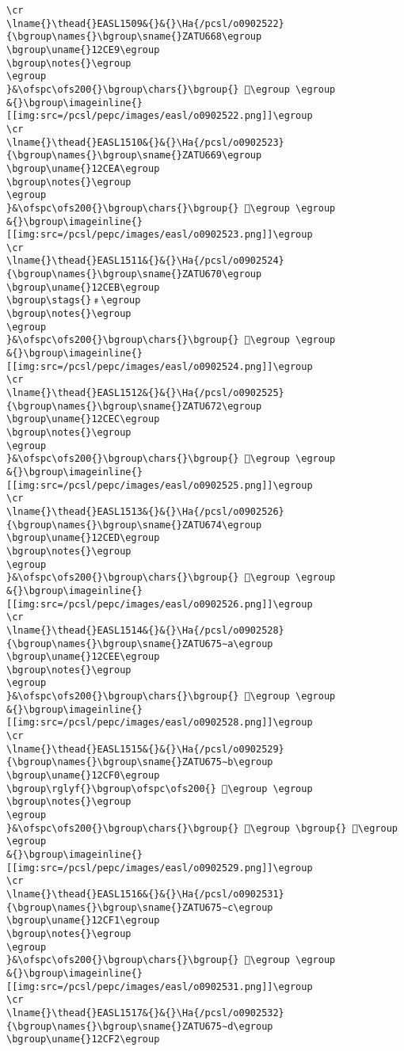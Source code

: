 \begin{verbatim}
\cr
\lname{}\thead{}EASL1509&{}&{}\Ha{/pcsl/o0902522}{\bgroup\names{}\bgroup\sname{}ZATU668\egroup
\bgroup\uname{}12CE9\egroup
\bgroup\notes{}\egroup
\egroup
}&\ofspc\ofs200{}\bgroup\chars{}\bgroup{} 𒳩\egroup \egroup
&{}\bgroup\imageinline{}[[img:src=/pcsl/pepc/images/easl/o0902522.png]]\egroup
\cr
\lname{}\thead{}EASL1510&{}&{}\Ha{/pcsl/o0902523}{\bgroup\names{}\bgroup\sname{}ZATU669\egroup
\bgroup\uname{}12CEA\egroup
\bgroup\notes{}\egroup
\egroup
}&\ofspc\ofs200{}\bgroup\chars{}\bgroup{} 𒳪\egroup \egroup
&{}\bgroup\imageinline{}[[img:src=/pcsl/pepc/images/easl/o0902523.png]]\egroup
\cr
\lname{}\thead{}EASL1511&{}&{}\Ha{/pcsl/o0902524}{\bgroup\names{}\bgroup\sname{}ZATU670\egroup
\bgroup\uname{}12CEB\egroup
\bgroup\stags{}﹟\egroup
\bgroup\notes{}\egroup
\egroup
}&\ofspc\ofs200{}\bgroup\chars{}\bgroup{} 𒳫\egroup \egroup
&{}\bgroup\imageinline{}[[img:src=/pcsl/pepc/images/easl/o0902524.png]]\egroup
\cr
\lname{}\thead{}EASL1512&{}&{}\Ha{/pcsl/o0902525}{\bgroup\names{}\bgroup\sname{}ZATU672\egroup
\bgroup\uname{}12CEC\egroup
\bgroup\notes{}\egroup
\egroup
}&\ofspc\ofs200{}\bgroup\chars{}\bgroup{} 𒳬\egroup \egroup
&{}\bgroup\imageinline{}[[img:src=/pcsl/pepc/images/easl/o0902525.png]]\egroup
\cr
\lname{}\thead{}EASL1513&{}&{}\Ha{/pcsl/o0902526}{\bgroup\names{}\bgroup\sname{}ZATU674\egroup
\bgroup\uname{}12CED\egroup
\bgroup\notes{}\egroup
\egroup
}&\ofspc\ofs200{}\bgroup\chars{}\bgroup{} 𒳭\egroup \egroup
&{}\bgroup\imageinline{}[[img:src=/pcsl/pepc/images/easl/o0902526.png]]\egroup
\cr
\lname{}\thead{}EASL1514&{}&{}\Ha{/pcsl/o0902528}{\bgroup\names{}\bgroup\sname{}ZATU675∼a\egroup
\bgroup\uname{}12CEE\egroup
\bgroup\notes{}\egroup
\egroup
}&\ofspc\ofs200{}\bgroup\chars{}\bgroup{} 𒳮\egroup \egroup
&{}\bgroup\imageinline{}[[img:src=/pcsl/pepc/images/easl/o0902528.png]]\egroup
\cr
\lname{}\thead{}EASL1515&{}&{}\Ha{/pcsl/o0902529}{\bgroup\names{}\bgroup\sname{}ZATU675∼b\egroup
\bgroup\uname{}12CF0\egroup
\bgroup\rglyf{}\bgroup\ofspc\ofs200{} 𒳰\egroup \egroup
\bgroup\notes{}\egroup
\egroup
}&\ofspc\ofs200{}\bgroup\chars{}\bgroup{} 𒳯\egroup \bgroup{} 𒳰\egroup \egroup
&{}\bgroup\imageinline{}[[img:src=/pcsl/pepc/images/easl/o0902529.png]]\egroup
\cr
\lname{}\thead{}EASL1516&{}&{}\Ha{/pcsl/o0902531}{\bgroup\names{}\bgroup\sname{}ZATU675∼c\egroup
\bgroup\uname{}12CF1\egroup
\bgroup\notes{}\egroup
\egroup
}&\ofspc\ofs200{}\bgroup\chars{}\bgroup{} 𒳱\egroup \egroup
&{}\bgroup\imageinline{}[[img:src=/pcsl/pepc/images/easl/o0902531.png]]\egroup
\cr
\lname{}\thead{}EASL1517&{}&{}\Ha{/pcsl/o0902532}{\bgroup\names{}\bgroup\sname{}ZATU675∼d\egroup
\bgroup\uname{}12CF2\egroup

\end{verbatim}

